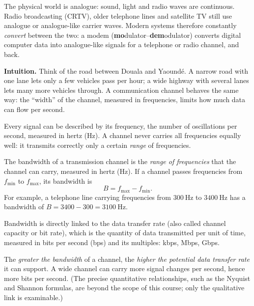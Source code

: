 \documentclass[11pt]{article}
\newcommand{\cle}[1]{{\popxbold\color{popdark}#1}}
\newcounter{popsec}
\newcounter{popsub}
\newcommand{\courssub}[1]{%
  \stepcounter{popsub}%
  \par\vspace{9pt}\noindent{\popxbold\fontsize{11.5}{13}\selectfont\color{popink}{\color{poporange}\thepopsec.\thepopsub}\hspace{6pt}#1}\par\nopagebreak\vspace{4pt}
}
\begin{document}
\begin{attention}
The physical world is analogue: sound, light and radio waves are continuous. Radio broadcasting (CRTV), older telephone lines and satellite TV still use analogue or analogue-like carrier waves. Modern systems therefore constantly \emph{convert} between the two: a modem (\textbf{mo}dulator--\textbf{dem}odulator) converts digital computer data into analogue-like signals for a telephone or radio channel, and back.
\end{attention}

\courssub{Bandwidth: The Width of the Road}

\textbf{Intuition.} Think of the road between Douala and Yaoundé. A narrow road with one lane lets only a few vehicles pass per hour; a wide highway with several lanes lets many more vehicles through. A communication channel behaves the same way: the ``width'' of the channel, measured in frequencies, limits how much data can flow per second.

Every signal can be described by its \cle{frequency}, the number of oscillations per second, measured in \cle{hertz} (Hz). A channel never carries all frequencies equally well: it transmits correctly only a certain \emph{range} of frequencies.

\begin{definition}[Bandwidth]
The \cle{bandwidth} of a transmission channel is the \emph{range of frequencies} that the channel can carry, measured in \cle{hertz} (Hz). If a channel passes frequencies from $f_{\min}$ to $f_{\max}$, its bandwidth is
\[ B = f_{\max} - f_{\min}. \]
For example, a telephone line carrying frequencies from $300\ \mathrm{Hz}$ to $3400\ \mathrm{Hz}$ has a bandwidth of $B = 3400 - 300 = 3100\ \mathrm{Hz}$.
\end{definition}

Bandwidth is directly linked to the \cle{data transfer rate} (also called channel capacity or bit rate), which is the quantity of data transmitted per unit of time, measured in \cle{bits per second} (bps) and its multiples: kbps, Mbps, Gbps.

\begin{propriete}
The \emph{greater the bandwidth} of a channel, the \emph{higher the potential data transfer rate} it can support. A wide channel can carry more signal changes per second, hence more bits per second. (The precise quantitative relationships, such as the Nyquist and Shannon formulas, are beyond the scope of this course; only the qualitative link is examinable.)
\end{propriete}
\end{document}
